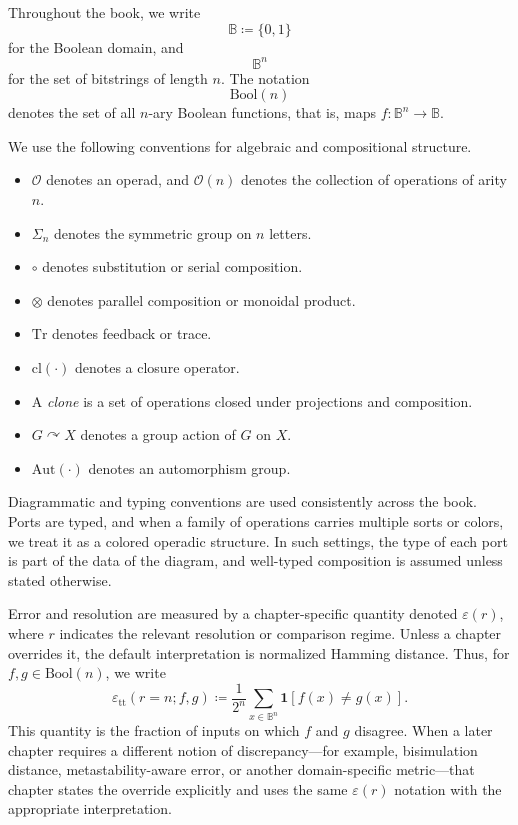 \documentclass[11pt]{article}
\begin{document}
Throughout the book, we write
\[
\mathbb{B} \coloneqq \{0,1\}
\]
for the Boolean domain, and
\[
\mathbb{B}^n
\]
for the set of bitstrings of length $n$. The notation
\[
\mathrm{Bool}(n)
\]
denotes the set of all $n$-ary Boolean functions, that is, maps $f : \mathbb{B}^n \to \mathbb{B}$.

We use the following conventions for algebraic and compositional structure.
\begin{itemize}
  \item $\mathcal{O}$ denotes an operad, and $\mathcal{O}(n)$ denotes the collection of operations of arity $n$.
  \item $\Sigma_n$ denotes the symmetric group on $n$ letters.
  \item $\circ$ denotes substitution or serial composition.
  \item $\otimes$ denotes parallel composition or monoidal product.
  \item $\mathrm{Tr}$ denotes feedback or trace.
  \item $\mathrm{cl}(\cdot)$ denotes a closure operator.
  \item A \emph{clone} is a set of operations closed under projections and composition.
  \item $G \curvearrowright X$ denotes a group action of $G$ on $X$.
  \item $\mathrm{Aut}(\cdot)$ denotes an automorphism group.
\end{itemize}

Diagrammatic and typing conventions are used consistently across the book. Ports are typed, and when a family of operations carries multiple sorts or colors, we treat it as a colored operadic structure. In such settings, the type of each port is part of the data of the diagram, and well-typed composition is assumed unless stated otherwise.

Error and resolution are measured by a chapter-specific quantity denoted $\varepsilon(r)$, where $r$ indicates the relevant resolution or comparison regime. Unless a chapter overrides it, the default interpretation is normalized Hamming distance. Thus, for $f,g \in \mathrm{Bool}(n)$, we write
\[
\varepsilon_{\mathrm{tt}}(r=n; f,g)
\coloneqq \frac{1}{2^n} \sum_{x \in \mathbb{B}^n} \mathbf{1}[f(x) \neq g(x)].
\]
This quantity is the fraction of inputs on which $f$ and $g$ disagree. When a later chapter requires a different notion of discrepancy---for example, bisimulation distance, metastability-aware error, or another domain-specific metric---that chapter states the override explicitly and uses the same $\varepsilon(r)$ notation with the appropriate interpretation.
\end{document}
